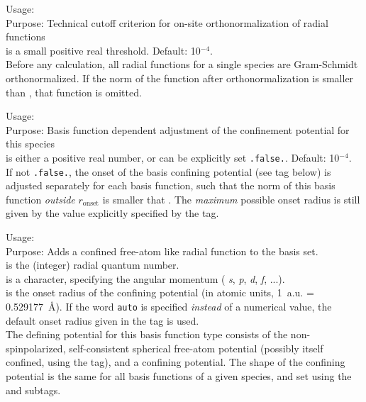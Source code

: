 {
  \noindent
  Usage:   \\[1.0ex]
  Purpose: Technical cutoff criterion for on-site orthonormalization
    of radial functions \\[1.0ex]
   is a small positive real threshold. Default:
  10$^{-4}$. \\
}
Before any calculation, all radial functions for a single species are
Gram-Schmidt orthonormalized. If the norm of the function after
  orthonormalization is smaller than , that function
  is omitted.

{
  \noindent
  Usage:   \\[1.0ex]
  Purpose: Basis function dependent adjustment of the confinement
  potential for this species \\[1.0ex]
   is either a positive real number, or can be
  explicitly set \texttt{.false.}. Default: 10$^{-4}$. \\
}
If not \texttt{.false.}, the onset of the basis confining potential
(see  tag below) is adjusted separately
  for each basis function, such that the norm of this basis function
  \emph{outside} $r_\text{onset}$ is smaller that
  . The \emph{maximum} possible onset radius is
  still given by the value explicitly specified by the
   tag. 

{
  \noindent
  Usage:   
     \\[1.0ex]
  Purpose: Adds a confined free-atom like radial function to the basis
    set. \\[1.0ex]
   is the (integer) radial quantum number. \\
   is a character, specifying the angular momentum (
    \emph{s}, \emph{p}, \emph{d}, \emph{f}, ...). \\
   is the onset radius of the confining potential
    (in atomic units, 1~a.u. = 0.529177~\AA). If the word
    \texttt{auto} is specified \emph{instead} of a numerical value,
    the default onset radius given in the
     tag is used. \\
}
The defining potential for this basis function type consists of the
non-spinpolarized, self-consistent spherical free-atom potential
(possibly itself confined, using the
 tag), and a confining
potential. The shape of the confining potential is the same for all
basis functions of a given species, and set using the
 and  
subtags. 

